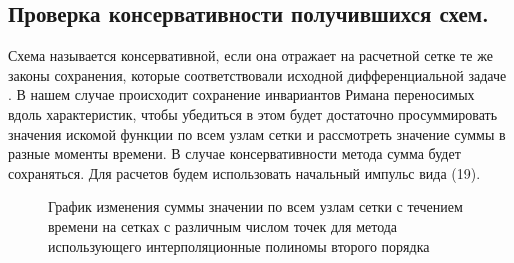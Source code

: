 \documentclass[14pt]{article}
\begin{document}
\subsection{Проверка консервативности получившихся схем.}
Схема называется консервативной, если она отражает на  расчетной сетке те же законы сохранения, которые соответствовали исходной дифференциальной задаче \cite{21}. В нашем случае происходит сохранение инвариантов Римана переносимых вдоль характеристик, чтобы убедиться в этом будет достаточно просуммировать значения искомой функции по всем узлам сетки и рассмотреть значение суммы в разные моменты времени. В случае консервативности метода сумма будет сохраняться. Для расчетов будем использовать начальный импульс вида (19).
\begin{figure}[H]
\caption{График изменения суммы значении по всем узлам сетки с течением времени на сетках с различным числом точек для метода использующего интерполяционные полиномы второго порядка}
\end{figure}
\end{document}
